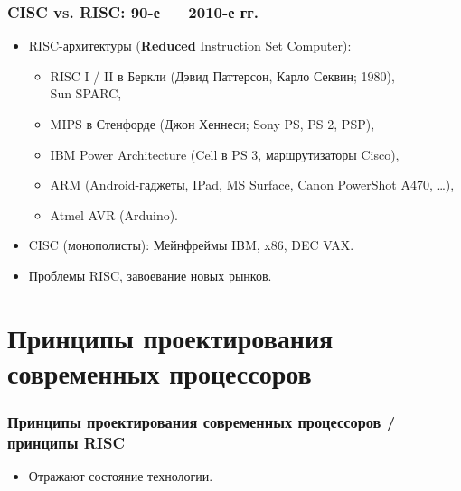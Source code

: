 \begin{frame}
\frametitle{CISC vs. RISC: 90-е — 2010-е гг.}
\begin{itemize}\itemsep=.6cm
    \item RISC-архитектуры (\textbf{\textcolor{blue!60!black}{Reduced}} Instruction Set Computer):
    \begin{itemize}\itemsep=.2cm
        \item RISC I / II в Беркли (Дэвид Паттерсон, Карло Секвин; 1980),\\Sun SPARC,
        \item MIPS в Стенфорде (Джон Хеннеси; Sony PS, PS 2, PSP),
        \item IBM Power Architecture (Cell в PS 3, маршрутизаторы Cisco),
        \item ARM (Android-гаджеты, IPad, MS Surface, Canon PowerShot A470, …),
        \item Atmel AVR (Arduino).
    \end{itemize}
    \pause\item CISC (монополисты): Мейнфреймы IBM, x86, DEC VAX.
    \pause\item Проблемы RISC, завоевание новых рынков.
\end{itemize}
\end{frame}

\section {Принципы проектирования современных процессоров}
\begin{frame}
\frametitle{Принципы проектирования современных процессоров / принципы RISC}
\pause
\begin{itemize}
    \item Отражают состояние технологии.
\end{itemize}

\end{frame}

